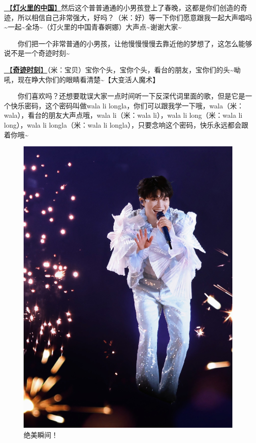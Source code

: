 \documentclass[]{ctexbook}
\begin{document}
\hyperref[China-in-the-light]{🎵【\textbf{灯火里的中国}】}然后这个普普通通的小男孩登上了春晚，这都是你们创造的奇迹，所以相信自己非常强大，好吗？（米：好）等一下你们愿意跟我一起大声唱吗\textasciitilde 一起\textasciitilde 全场\textasciitilde（灯火里的中国青春婀娜）大声点\textasciitilde 谢谢大家\textasciitilde{}

  你们把一个非常普通的小男孩，让他慢慢慢慢去靠近他的梦想了，这怎么能够说不是一个奇迹时刻\textasciitilde{}

\hyperref[magic-moment]{🎵【\textbf{奇迹时刻}】}（米：宝贝）宝你个头，宝你个头，看台的朋友，宝你们的头\textasciitilde 呦吼，现在睁大你们的眼睛看清楚\textasciitilde【大变活人魔术】

  你们喜欢吗？还想要耽误大家一点时间听一下反深代词里面的歌，但是它是一个快乐密码，这个密码叫做wala li longla，你们可以跟我学一下哦，wala（米：wala），看台的朋友大声点哦，wala li（米：wala li），wala li long（米：wala li long），wala li longla（米：wala li longla），只要念响这个密码，快乐永远都会跟着你哦\textasciitilde{}

\begin{figure}

{\centering \includegraphics[width=400pt]{img/beijing20240921/001} 

}

\caption{绝美瞬间！}\label{fig:unnamed-chunk-92}
\end{figure}
\end{document}
